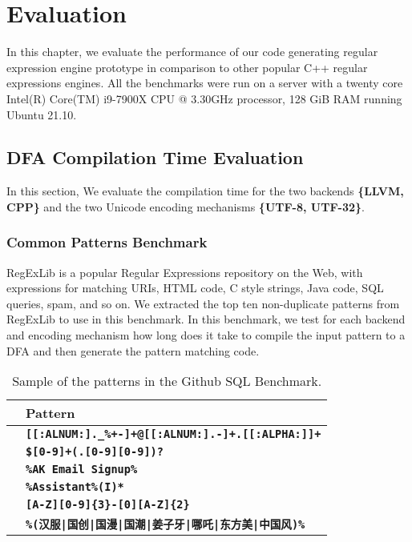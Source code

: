 \chapter{Evaluation}\label{chapter:evaluation}
In this chapter, we evaluate the performance of our code generating regular expression engine prototype in comparison to other popular C++ regular expressions engines. All the benchmarks were run on a server with a twenty core Intel(R) Core(TM) i9-7900X CPU @ 3.30GHz processor, 128 GiB RAM running Ubuntu 21.10.

\newcommand\rownumberone{\stepcounter{magicrownumbers1}\arabic{magicrownumbers1}}
\newcommand\rownumbertwo{\stepcounter{magicrownumbers2}\arabic{magicrownumbers2}}

\section{DFA Compilation Time Evaluation}
In this section, We evaluate the compilation time for the two backends \textbf{\{LLVM, CPP\}} and the two Unicode encoding mechanisms \textbf{\{UTF-8, UTF-32\}}.

\subsection{Common Patterns Benchmark}
RegExLib \cite{regexlib} is a popular Regular Expressions repository on the Web, with expressions for matching URIs, HTML code, C style strings, Java code, SQL queries, spam, and so on. We extracted the top ten non-duplicate patterns from RegExLib to use in this benchmark. In this benchmark, we test for each backend and encoding mechanism how long does it take to compile the input pattern to a DFA and then generate the pattern matching code. 

{\renewcommand{\arraystretch}{1.5}%
\begin{table}[H]
\centering
\small
\begin{tabularx}{\textwidth}{|l|X|}
\hline
& Pattern       \\
\hline
\rownumberone & \texttt{\textbf{{[}{[}:ALNUM:{]}.\_\%+-{]}+@{[}{[}:ALNUM:{]}.-{]}+.{[}{[}:ALPHA:{]}{]}+}} \\
\hline
\rownumberone & \texttt{\textbf{\${[}0-9{]}+(.{[}0-9{]}{[}0-9{]})?}}                                      \\
\hline
\rownumberone &\texttt{\textbf{\%AK Email Signup\%}}                                                     \\
\hline
\rownumberone &\texttt{\textbf{\%Assistant\%(I)*}}                                                       \\
\hline
\rownumberone &\texttt{\textbf{{[}A-Z{]}{[}0-9{]}\{3\}-{[}0{]}{[}A-Z{]}\{2\}}}                          \\
\hline
\rownumberone & \texttt{\textbf{\%(汉服|国创|国漫|国潮|姜子牙|哪吒|东方美|中国风)\%}}     \\            
\hline
\end{tabularx}
\caption{Sample of the patterns in the Github SQL Benchmark.}\label{tab:samplesql}
\end{table}}

